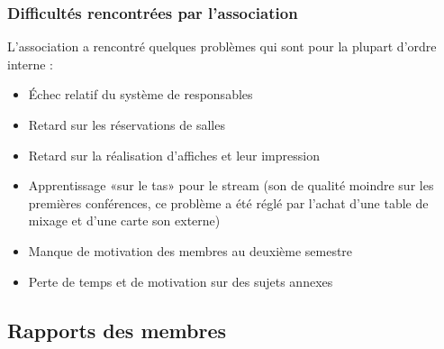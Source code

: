 \documentclass[12pt]{report}
\begin{document}
    \subsection{Difficultés rencontrées par l'association}
    L'association a rencontré quelques problèmes qui sont pour la plupart
    d'ordre interne :\\
    \begin{itemize}
            \item Échec relatif du système de responsables
            \item Retard sur les réservations de salles
            \item Retard sur la réalisation d'affiches et leur impression
            \item Apprentissage «sur le tas» pour le stream (son de qualité
                    moindre sur les premières conférences, ce problème a été
                    réglé par l'achat d'une table de mixage et d'une carte son
                    externe)
            \item Manque de motivation des membres au deuxième semestre
            \item Perte de temps et de motivation sur des sujets annexes
    \end{itemize}
  \begin{appendices}
    \chapter{Rapports des membres}
    
    
    
    
    
    
  \end{appendices}
\end{document}
